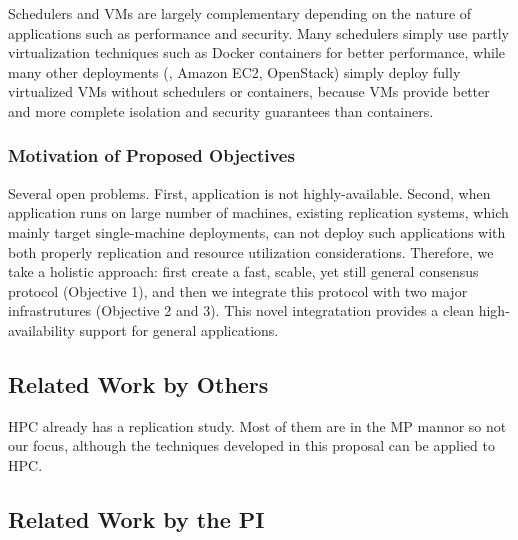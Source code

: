 Schedulers and VMs are largely complementary depending on the nature of 
applications such as performance and security. Many schedulers simply use 
partly virtualization techniques such as Docker containers for better 
performance, while many other deployments (\eg, Amazon EC2, OpenStack) simply 
deploy fully virtualized VMs without schedulers or containers, because VMs 
provide better and more complete isolation and security guarantees than 
containers.


\vspace{-.15in}\subsubsection{Motivation of Proposed Objectives} 
\label{sec:motivation}\vspace{-.075in}

Several open problems. First, application is not highly-available. Second, when 
application runs on large number of machines, existing replication systems, 
which mainly target single-machine deployments, can not deploy such 
applications with both properly replication and resource utilization 
considerations. Therefore, we take a holistic approach: first create a fast, 
scable, yet still general consensus protocol (Objective 1), and then we 
integrate this protocol with two major infrastrutures (Objective 2 and 3). This 
novel integratation provides a clean high-availability support for general  
applications.

\vspace{-.15in}\subsection{Related Work by Others} 
\label{sec:others-work}\vspace{-.075in}




 HPC already has a replication study. Most of them are in the MP 
mannor so not our focus, although the techniques developed in this proposal can 
be applied to HPC.

\vspace{-.15in}\subsection{Related Work by the PI} 
\label{sec:my-work}\vspace{-.075in}
% 


